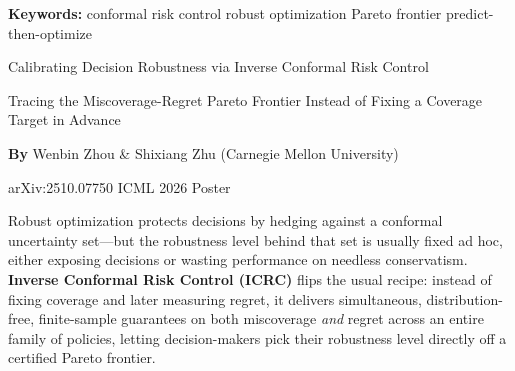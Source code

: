 \documentclass[10pt,twocolumn]{article}
\begin{document}
\setlength{\parindent}{0pt}
\setlength{\parskip}{4pt}

{\small\color{keywordgray}\textbf{Keywords:}
  conformal risk control \textbullet{}
  robust optimization \textbullet{}
  Pareto frontier \textbullet{}
  predict-then-optimize}\par\vspace{4pt}

{\LARGE\bfseries\raggedright
  Calibrating Decision Robustness via Inverse Conformal Risk
  Control}\par\vspace{4pt}

{\large\itshape\raggedright
  Tracing the Miscoverage-Regret Pareto Frontier Instead of Fixing a
  Coverage Target in Advance}\par\vspace{6pt}

{\small\textbf{By} Wenbin Zhou \& Shixiang Zhu
  (Carnegie Mellon University)}\par\vspace{2pt}

{\small\color{keywordgray}arXiv:2510.07750 \textbullet{}
  ICML 2026 Poster}
\par\vspace{2pt}\noindent{\color{rulered}\rule{\columnwidth}{0.6pt}}\vspace{6pt}

Robust optimization protects decisions by hedging against a conformal
uncertainty set---but the robustness level behind that set is usually
fixed ad hoc, either exposing decisions or wasting performance on
needless conservatism. \textbf{Inverse Conformal Risk Control (ICRC)}
flips the usual recipe: instead of fixing coverage and later measuring
regret, it delivers simultaneous, distribution-free, finite-sample
guarantees on both miscoverage \emph{and} regret across an entire
family of policies, letting decision-makers pick their robustness level
directly off a certified Pareto frontier.
\end{document}

